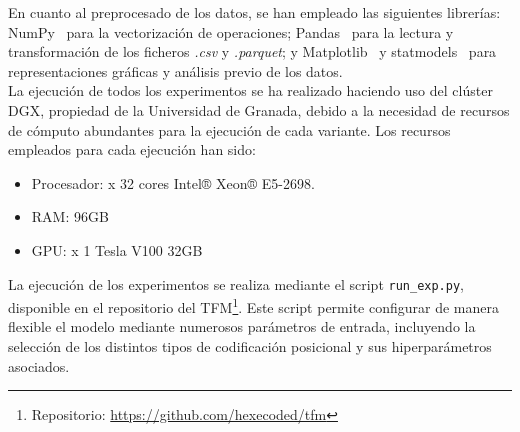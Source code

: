 En cuanto al preprocesado de los datos, se han empleado las siguientes librerías: NumPy~\cite{harris2020array} para la vectorización de operaciones; Pandas~\cite{mckinney-proc-scipy-2010} para la lectura y transformación de los ficheros \textit{.csv} y \textit{.parquet}; y Matplotlib~\cite{Hunter:2007} y statmodels~\cite{seabold2010statsmodels} para representaciones gráficas y análisis previo de los datos.\\

La ejecución de todos los experimentos se ha realizado haciendo uso del clúster DGX, propiedad de la Universidad de Granada, debido a la necesidad de recursos de cómputo abundantes para la ejecución de cada variante. Los recursos empleados para cada ejecución han sido:

\begin{itemize}
	\item Procesador: x 32 cores Intel® Xeon® E5-2698.
	\item RAM: 96GB
	\item GPU: x 1 Tesla V100 32GB 
\end{itemize}

La ejecución de los experimentos se realiza mediante el script \texttt{run\_exp.py}, disponible en el repositorio del TFM\footnote{Repositorio: \url{https://github.com/hexecoded/tfm}}. Este script permite configurar de manera flexible el modelo mediante numerosos parámetros de entrada, incluyendo la selección de los distintos tipos de codificación posicional y sus hiperparámetros asociados.

